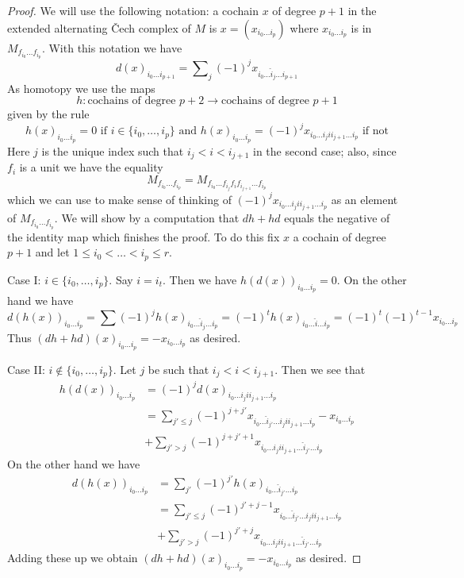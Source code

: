 \begin{proof}
We will use the following notation: a cochain $x$ of degree $p + 1$
in the extended alternating {\v C}ech complex of $M$ is
$x = (x_{i_0 \ldots i_p})$ where $x_{i_0 \ldots i_p}$ is in
$M_{f_{i_0} \ldots f_{i_p}}$. With this notation we have
$$
d(x)_{i_0 \ldots i_{p + 1}} =
\sum\nolimits_j (-1)^j x_{i_0 \ldots \hat i_j \ldots i_{p + 1}}
$$
As homotopy we use the maps
$$
h : \text{cochains of degree }p + 2 \to \text{cochains of degree }p + 1
$$
given by the rule
$$
h(x)_{i_0 \ldots i_p} = 0 \text{ if } i \in \{i_0, \ldots, i_p\}
\text{ and }
h(x)_{i_0 \ldots i_p} = 
(-1)^j x_{i_0 \ldots i_j i i_{j + 1} \ldots i_p} \text{ if not}
$$
Here $j$ is the unique index such that $i_j < i < i_{j + 1}$ in the
second case; also, since $f_i$ is a unit we have the equality
$$
M_{f_{i_0} \ldots f_{i_p}} =
M_{f_{i_0} \ldots f_{i_j} f_i f_{i_{j + 1}} \ldots f_{i_p}}
$$
which we can use to make sense of thinking of
$(-1)^j x_{i_0 \ldots i_j i i_{j + 1} \ldots i_p}$
as an element of $M_{f_{i_0} \ldots f_{i_p}}$.
We will show by a computation that $d h + h d$ equals
the negative of the identity map which finishes the proof.
To do this fix $x$ a cochain of degree $p + 1$ and let
$1 \leq i_0 < \ldots < i_p \leq r$.

\medskip\noindent
Case I: $i \in \{i_0, \ldots, i_p\}$. Say $i = i_t$. Then we have
$h(d(x))_{i_0 \ldots i_p} = 0$. On the other hand we have
$$
d(h(x))_{i_0 \ldots i_p} =
\sum (-1)^j h(x)_{i_0 \ldots \hat i_j \ldots i_p} =
(-1)^t h(x)_{i_0 \ldots \hat i \ldots i_p} =
(-1)^t (-1)^{t - 1} x_{i_0 \ldots i_p}
$$
Thus $(dh + hd)(x)_{i_0 \ldots i_p} = -x_{i_0 \ldots i_p}$ as desired.

\medskip\noindent
Case II: $i \not \in \{i_0, \ldots, i_p\}$. Let $j$ be such that
$i_j < i < i_{j + 1}$. Then we see that
\begin{align*}
h(d(x))_{i_0 \ldots i_p}
& =
(-1)^j d(x)_{i_0 \ldots i_j i i_{j + 1} \ldots i_p} \\
& =
\sum\nolimits_{j' \leq j} (-1)^{j + j'}
x_{i_0 \ldots \hat i_{j'} \ldots i_j i i_{j + 1} \ldots i_p} -
x_{i_0 \ldots i_p} \\
&
+ \sum\nolimits_{j' > j} (-1)^{j + j' + 1}
x_{i_0 \ldots i_j i i_{j + 1} \ldots \hat i_{j'} \ldots i_p}
\end{align*}
On the other hand we have
\begin{align*}
d(h(x))_{i_0 \ldots i_p}
& =
\sum\nolimits_{j'} (-1)^{j'} h(x)_{i_0 \ldots \hat i_{j'} \ldots i_p} \\
& =
\sum\nolimits_{j' \leq j} (-1)^{j' + j - 1}
x_{i_0 \ldots \hat i_{j'} \ldots i_j i i_{j + 1} \ldots i_p} \\
& +
\sum\nolimits_{j' > j} (-1)^{j' + j}
x_{i_0 \ldots i_j i i_{j + 1} \ldots \hat i_{j'} \ldots i_p}
\end{align*}
Adding these up we obtain
$(dh + hd)(x)_{i_0 \ldots i_p} = - x_{i_0 \ldots i_p}$
as desired.
\end{proof}

